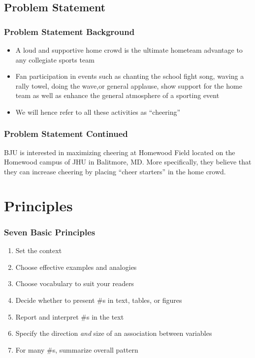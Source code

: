 \documentclass[compress,handout,10pt]{beamer}
\let\olditem\item
\renewcommand{\item}{\setlength{\itemsep}{0.5\baselineskip}\olditem}
\begin{document}
\subsection{Problem Statement}

\begin{frame}
	\frametitle{Problem Statement Background}
		\begin{itemize}
			\item A loud and supportive home crowd is the ultimate hometeam advantage to any collegiate sports team 
			\item Fan participation in events such as chanting the school fight song, waving a rally towel, doing the wave,or general applause, show support for the home team as well as enhance the general atmosphere of a sporting event 
			\item We will hence refer to all these activities as ``cheering''
		\end{itemize}
\end{frame}

\begin{frame}
	\frametitle{Problem Statement Continued}
		\begin {itemize}
			BJU is interested in maximizing cheering at Homewood Field located on the Homewood campus of JHU in Balitmore, MD.
			More specifically, they believe that they can increase cheering by placing ``cheer starters'' in the home crowd.
		\end {itemize}
\end{frame}

\section{Principles}
\begin{frame}
    \frametitle{Seven Basic Principles}
     \begin{enumerate}
         \item Set the context 
         \item Choose effective examples and analogies
         \item Choose vocabulary to suit your readers
         \item Decide whether to present \#s in text, tables, or figures
         \item Report and interpret \#s in the text
         \item Specify the direction \emph{and} size of an association between variables
         \item For many \#s, summarize overall pattern 
     \end{enumerate}
\end{frame}
\end{document}
